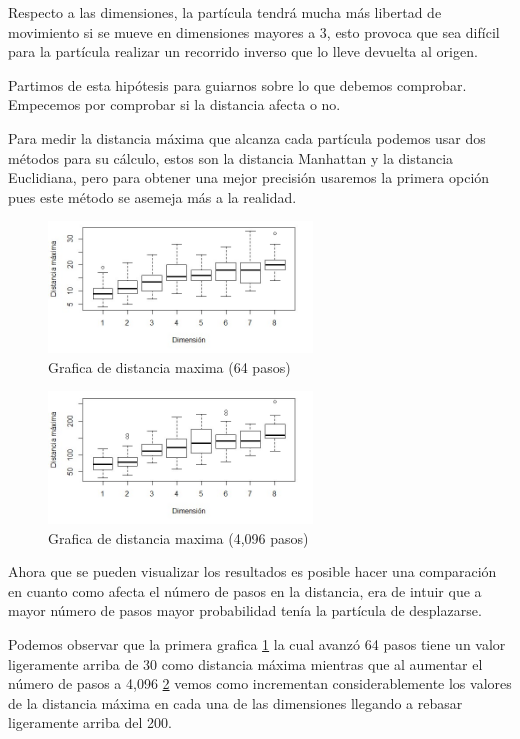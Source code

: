 \documentclass{article}
\begin{document}
Respecto a las dimensiones, la partícula tendrá mucha más libertad de movimiento si se mueve en dimensiones mayores a 3, esto provoca que sea difícil para la partícula realizar un recorrido inverso que lo lleve devuelta al origen.

Partimos de esta hipótesis para guiarnos sobre lo que debemos comprobar. Empecemos por comprobar si la distancia afecta o no.

Para medir la distancia máxima que alcanza cada partícula podemos usar dos métodos para su cálculo, estos son la distancia Manhattan y la distancia Euclidiana, pero para obtener una mejor precisión usaremos la primera opción pues este método se asemeja más a la realidad. 

\begin{figure}
\centering\includegraphics[width=70mm]{Distancia26.jpg}
\caption{Grafica de distancia maxima (64 pasos)}
\label{Grafica 1}
\end{figure}

\begin{figure}
\centering\includegraphics[width=70mm]{Distancia212.jpg}
\caption{Grafica de distancia maxima (4,096 pasos)}
\label{Grafica 2}
\end{figure}

Ahora que se pueden visualizar los resultados es posible hacer una comparación en cuanto como afecta el número de pasos en la distancia, era de intuir que a mayor número de pasos mayor probabilidad tenía la partícula de desplazarse.

Podemos observar que la primera grafica \ref{Grafica 1} la cual avanzó 64 pasos tiene un valor ligeramente arriba de 30 como distancia máxima mientras que al aumentar el número de pasos a 4,096 \ref{Grafica 2} vemos como incrementan considerablemente los valores de la distancia máxima en cada una de las dimensiones llegando a rebasar ligeramente arriba del 200.
\end{document}
